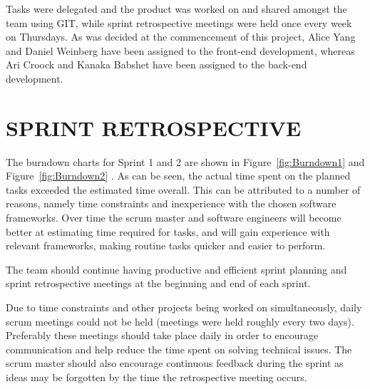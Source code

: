 \documentclass[10pt,twocolumn]{witseiepaper}
\begin{document}
	Tasks were delegated and the product was worked on and shared amongst the team using GIT, while sprint retrospective meetings were held once every week on Thursdays.
	\newline
	\newline	
	As was decided at the commencement of this project, Alice Yang and Daniel Weinberg have been assigned to the front-end development, whereas Ari Croock and Kanaka Babshet have been assigned to the back-end development. 
	
	
	
	\section{SPRINT RETROSPECTIVE}
	
	The burndown charts for Sprint 1 and 2 are shown in Figure~\ref{fig:Burndown1} and Figure~\ref{fig:Burndown2} . As can be seen, the actual time spent on the planned tasks exceeded the estimated time overall. This can be attributed to a number of reasons, namely time constraints and inexperience with the chosen software frameworks. Over time the scrum master and software engineers will become better at estimating time required for tasks, and will gain experience with relevant frameworks, making routine tasks quicker and easier to perform.
	
	The team should continue having productive and efficient sprint planning and sprint retrospective meetings at the beginning and end of each sprint. 
	
	Due to time constraints and other projects being worked on simultaneously, daily scrum meetings could not be held (meetings were held roughly every two days). Preferably these meetings should take place daily in order to encourage communication and help reduce the time spent on solving technical issues. 
	The scrum master should also encourage continuous feedback during the sprint as ideas may be forgotten by the time the retrospective meeting occurs.
	
\end{document}
